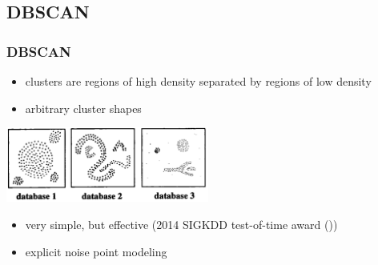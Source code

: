 \documentclass[Nike]{tuberlinbeamer}
\begin{document}
\subsection{DBSCAN}
\begin{frame}
  \frametitle{DBSCAN}
  \begin{itemize}
    \item clusters are regions of high density separated by regions of low density
    \item arbitrary cluster shapes
  \end{itemize}
  \begin{centering}
  \includegraphics[width=0.5\textwidth]{DBSCAN_data.png}
  \tiny \cite{ester1996density}\\
  \end{centering}
  \pause
  \normalsize
  \begin{itemize}
    \item very simple, but effective (2014 SIGKDD test-of-time award (\cite{schubert2017dbscan}))\\
    \item explicit noise point modeling
  \end{itemize}
\end{frame}
\end{document}
